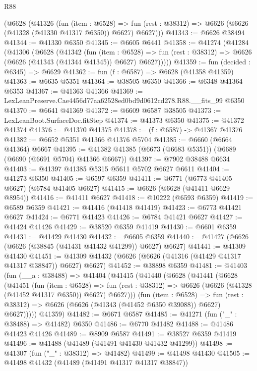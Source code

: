 \begin{lexlean}{R88}
\begin{coremodule}
    (@6628
      (@41326
        (fun (item : @6528) =>
        fun (rest : @38312) => @6626 (@6626 (@41328 (@41330 @41317 @6350)) @6627) @6627)))
@41343 := @6626 @38494
@41344 := @41330 @6350
@41345 := @6605 @6441
@41358 := @41274
    (@41284
      (@41306
        (@6628
          (@41342
            (fun (item : @6528) =>
            fun (rest : @38312) => @6626 (@6626 (@41343 (@41344 @41345)) @6627) @6627)))))
@41359 := fun (decided : @6345) => @6629
@41362 := fun (f : @6587) => @6628 (@41358 @41359)
@41363 := @6635 @5351
@41364 := @38505 @6350
@41366 := @6348 @41364 @6353
@41367 := @41363 @41366
@41369 := LexLeanPreserve.Cae4456d77aa62528ed0bd9d0612cd278.R88.__fits_99 @6350
@41370 := @6641 @41369
@41372 := @6609 @6587 @38505
@41373 := LexLeanBoot.SurfaceDoc.fitStep
@41374 := @41373 @6350
@41375 := @41372 @41374
@41376 := @41370 @41375
@41378 := (f : @6587) -> @41367 @41376
@41382 := @6652 @5351 @41366 @41376 @5704
@41385 := @6660 (@6664 @41364) @6667
@41395 := @41382 @41385 (@6673 (@6683 @5351)) (@6689 (@6690 (@6691 @5704) @41366 @6667))
@41397 := @7902 @38488 @6634
@41403 := @41397 @41385 @5315 @5611 @5702 @6627 @6611
@41404 := @41273 @6350
@41405 := @6597 @6359
@41411 := @6771 (@6773 @41405 @6627) (@6784 @41405 @6627)
@41415 := @6626 (@6628 (@41411 @6629 @8954))
@41416 := @41411 @6627
@41418 := @10222 (@6593 @6359)
@41419 := @6589 @6359
@41421 := @41416 (@41418 @41419)
@41423 := @6773 @41421 @6627
@41424 := @6771 @41423
@41426 := @6784 @41421 @6627
@41427 := @41424 @41426
@41429 := @38520 @6359 @41419
@41430 := @6601 @6359
@41431 := @41429 @41430
@41432 := @6605 @6359
@41440 := @41427 (@6626 (@6626 (@38845 (@41431 @41432 @41299)) @6627) @6627)
@41441 := @41309 @41430
@41451 := @41309 @41432 (@6626 (@6626 (@41316 (@41429 @41317 @41317 @38847)) @6627) @6627)
@41452 := @38898 @6359
@41481 := @41403
    (fun (__a : @38488) =>
    @41404
      (@41415
        (@41440
          (@6628
            (@41441
              (@6628
                (@41451
                  (fun (item : @6528) =>
                  fun (rest : @38312) => @6626 (@6626 (@41328 (@41452 @41317 @6350)) @6627) @6627)))
              (fun (item : @6528) =>
              fun (rest : @38312) => @6626 (@6626 (@41343 (@41452 @6350 @39088)) @6627) @6627)))))
      @41359)
@41482 := @6671 @6587
@41485 := @41271 (fun ("_" : @38488) => @41482) @6350
@41486 := @6770 @41482
@41488 := @41486 @41423 @41426
@41489 := @8909 @6587
@41491 := @38527 @6359 @41419
@41496 := @41488 (@41489 (@41491 @41430 @41432 @41299))
@41498 := @41307 (fun ("_" : @38312) => @41482)
@41499 := @41498 @41430
@41505 := @41498 @41432 (@41489 (@41491 @41317 @41317 @38847))

\end{coremodule}
\end{lexlean}
